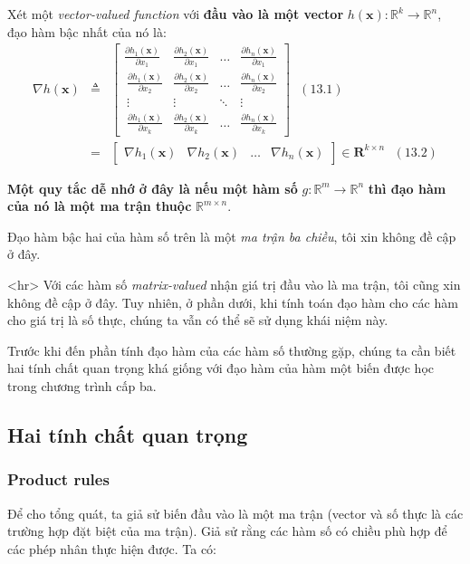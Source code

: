 Xét một \textit{vector-valued function} với \textbf{đầu vào là một vector} $h(\mathbf{x}):\mathbb{R}^k \rightarrow \mathbb{R}^n$, đạo hàm bậc nhất của nó là: 
\begin{eqnarray*} 
\nabla h(\mathbf{x}) &\triangleq & 
\left[ 
\begin{matrix} 
    \frac{\partial h_1(\mathbf{x})}{\partial x_1} & \frac{\partial h_2(\mathbf{x})}{\partial x_1} & \dots & \frac{\partial h_n(\mathbf{x})}{\partial x_1} \\\  
    \frac{\partial h_1(\mathbf{x})}{\partial x_2} & \frac{\partial h_2(\mathbf{x})}{\partial x_2} & \dots & \frac{\partial h_n(\mathbf{x})}{\partial x_2} \\\  
    \vdots & \vdots & \ddots & \vdots \\\ 
    \frac{\partial h_1(\mathbf{x})}{\partial x_k} & \frac{\partial h_2(\mathbf{x})}{\partial x_k} & \dots & \frac{\partial h_n(\mathbf{x})}{\partial x_k} 
\end{matrix} 
\right]~~~(13.1)\\\ 
& = &  
\left[ 
\begin{matrix} 
    \nabla h_1(\mathbf{x}) & \nabla h_2(\mathbf{x}) & \dots & \nabla h_n(\mathbf{x}) 
\end{matrix} 
\right] \in \mathbf{R}^{k\times n} ~~~ (13.2) 
\end{eqnarray*} 
 
 
\textbf{Một quy tắc dễ nhớ ở đây là nếu một hàm số} $g: \mathbb{R}^m \rightarrow \mathbb{R}^n$ \textbf{thì đạo hàm của nó là một ma trận thuộc} $\mathbb{R}^{m \times n}$. 
 
Đạo hàm bậc hai của hàm số trên là một \textit{ma trận ba chiều}, tôi xin không đề cập ở đây.  
 

<hr> 
Với các hàm số \textit{matrix-valued} nhận giá trị đầu vào là ma trận, tôi cũng xin không đề cập ở đây. Tuy nhiên, ở phần dưới, khi tính toán đạo hàm cho các hàm cho giá trị là số thực, chúng ta vẫn có thể sẽ sử dụng khái niệm này. 
 
Trước khi đến phần tính đạo hàm của các hàm số thường gặp, chúng ta cần biết hai tính chất quan trọng khá giống với đạo hàm của hàm một biến được học trong chương trình cấp ba.  
 
 
\subsection{Hai tính chất quan trọng }
 
 
\subsubsection{Product rules}
Để cho tổng quát, ta giả sử biến đầu vào là một ma trận (vector và số thực là các trường hợp đặt biệt của ma trận). Giả sử rằng các hàm số có chiều phù hợp để các phép nhân thực hiện được. Ta có:  
 
